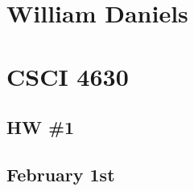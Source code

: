 \documentclass[11pt]{article}
\begin{document}
\begin{center}
\section*{William Daniels}
\section*{CSCI 4630}
\subsection*{HW \#1}
\subsection*{February 1st}
\end{center}
\vspace{.25cm}
\end{document}

